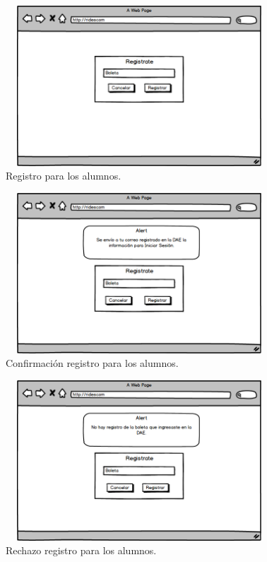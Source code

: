 \begin{figure}[hbt!]
	\centering
	\includegraphics[width=10cm, height=6cm]{Imagenes/Disenos/VistasBorradas/p1_Registro.png}
	\caption{Registro para los alumnos.}
\end{figure}

\begin{figure}[hbt!]
	\centering
	\includegraphics[width=10cm, height=6cm]{Imagenes/Disenos/VistasBorradas/ConfirmacionRegistro.png}
	\caption{Confirmación registro para los alumnos.}
\end{figure}

\begin{figure}[hbt!]
	\centering
	\includegraphics[width=10cm, height=6cm]{Imagenes/Disenos/VistasBorradas/p3RechazoRegistro.png}
	\caption{Rechazo registro para los alumnos.}
\end{figure}

